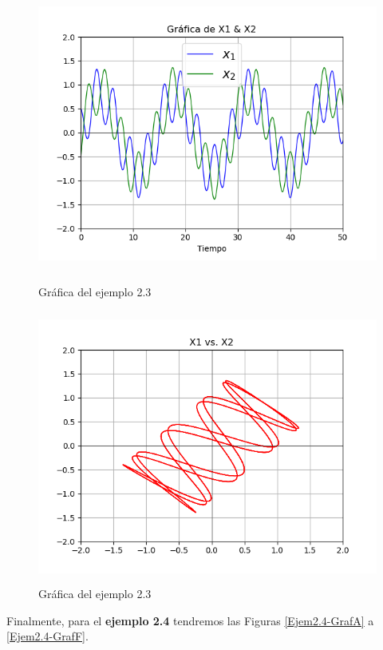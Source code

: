 \begin{figure}[h!]
	\begin{center}
        \includegraphics[height=9cm]{Ejem2_3-GrafE}
        \caption{Gráfica del ejemplo 2.3}

        \includegraphics[height=9cm]{Ejem2_3-GrafF}
        \caption{Gráfica del ejemplo 2.3}
        \label{Ejem2.3-GrafF}
    \end{center}
\end{figure}

Finalmente, para el \textbf{ejemplo 2.4} tendremos las Figuras \ref{Ejem2.4-GrafA} a \ref{Ejem2.4-GrafF}.

